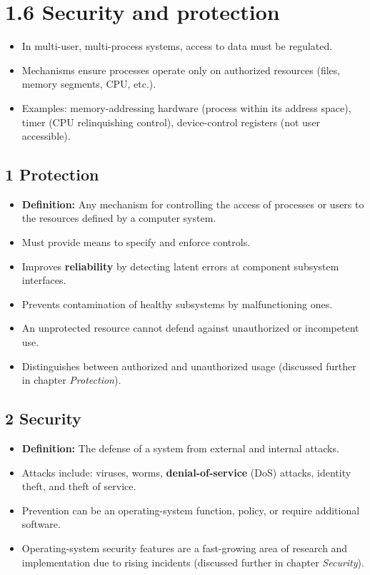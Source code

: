\documentclass{article}
\begin{document}
\newpage
\section*{1.6 Security and protection}
\begin{itemize}
    \item In multi-user, multi-process systems, access to data must be regulated.
    \item Mechanisms ensure processes operate only on authorized resources (files, memory segments, CPU, etc.).
    \item Examples: memory-addressing hardware (process within its address space), timer (CPU relinquishing control), device-control registers (not user accessible).
\end{itemize}

\subsection*{1 Protection}
\begin{itemize}
    \item \textbf{Definition:} Any mechanism for controlling the access of processes or users to the resources defined by a computer system.
    \item Must provide means to specify and enforce controls.
    \item Improves \textbf{reliability} by detecting latent errors at component subsystem interfaces.
    \item Prevents contamination of healthy subsystems by malfunctioning ones.
    \item An unprotected resource cannot defend against unauthorized or incompetent use.
    \item Distinguishes between authorized and unauthorized usage (discussed further in chapter \textit{Protection}).
\end{itemize}

\subsection*{2 Security}
\begin{itemize}
    \item \textbf{Definition:} The defense of a system from external and internal attacks.
    \item Attacks include: viruses, worms, \textbf{denial-of-service} (DoS) attacks, identity theft, and theft of service.
    \item Prevention can be an operating-system function, policy, or require additional software.
    \item Operating-system security features are a fast-growing area of research and implementation due to rising incidents (discussed further in chapter \textit{Security}).
\end{itemize}
\end{document}
